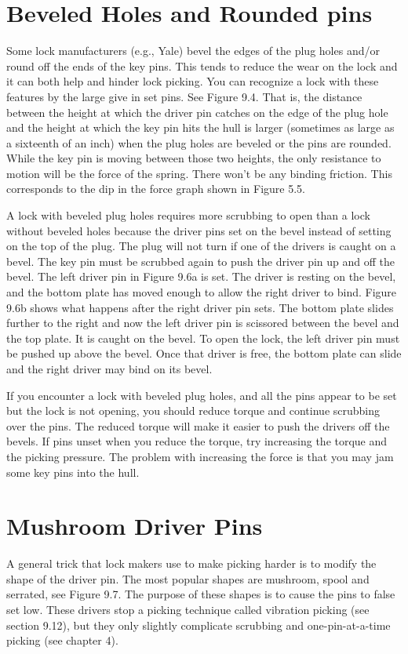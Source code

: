 \section{Beveled Holes and Rounded pins}
Some lock manufacturers (e.g., Yale) bevel the edges of the plug holes and/or round off
the ends of the key pins. This tends to reduce the wear on the lock and it can both help
and hinder lock picking. You can recognize a lock with these features by the large give in
set pins. See Figure 9.4. That is, the distance between the height at which the driver pin
catches on the edge of the plug hole and the height at which the key pin hits the hull is larger
(sometimes as large as a sixteenth of an inch) when the plug holes are beveled or the pins
are rounded. While the key pin is moving between those two heights, the only resistance to
motion will be the force of the spring. There won't be any binding friction. This corresponds
to the dip in the force graph shown in Figure 5.5.

A lock with beveled plug holes requires more scrubbing to open than a lock without
beveled holes because the driver pins set on the bevel instead of setting on the top of the
plug. The plug will not turn if one of the drivers is caught on a bevel. The key pin must
be scrubbed again to push the driver pin up and off the bevel. The left driver pin in Figure
9.6a is set. The driver is resting on the bevel, and the bottom plate has moved enough to
allow the right driver to bind. Figure 9.6b shows what happens after the right driver pin
sets. The bottom plate slides further to the right and now the left driver pin is scissored
between the bevel and the top plate. It is caught on the bevel. To open the lock, the left
driver pin must be pushed up above the bevel. Once that driver is free, the bottom plate can
slide and the right driver may bind on its bevel.

If you encounter a lock with beveled plug holes, and all the pins appear to be set but the
lock is not opening, you should reduce torque and continue scrubbing over the pins. The
reduced torque will make it easier to push the drivers off the bevels. If pins unset when you
reduce the torque, try increasing the torque and the picking pressure. The problem with
increasing the force is that you may jam some key pins into the hull.

\section{Mushroom Driver Pins}
A general trick that lock makers use to make picking harder is to modify the shape of the driver pin.
The most popular shapes are mushroom, spool and serrated, see Figure 9.7.
The purpose of these shapes is to cause the pins to false set low. These drivers stop a picking technique called vibration picking (see section 9.12), but they only slightly complicate scrubbing and one-pin-at-a-time picking (see chapter 4).


